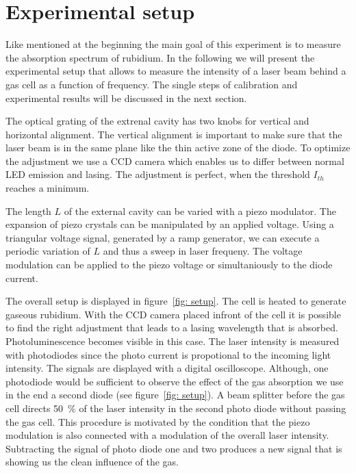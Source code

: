 \section{Experimental setup}
Like mentioned at the beginning the main goal of this experiment is to measure the absorption spectrum of rubidium.
In the following we will present the experimental setup that allows to measure the intensity of a laser beam
behind a gas cell as a function of frequency. The single steps of calibration and experimental results will be discussed
in the next section. 

The optical grating of the extrenal cavity has two knobs for vertical and horizontal alignment. The vertical alignment 
is important to make sure that the laser beam is in the same plane like the thin active zone of the diode. To optimize the adjustment 
we use a CCD camera which enables us to differ between normal LED emission and lasing. The adjustment is perfect, when the 
threshold $I_{th}$ reaches a minimum. 

The length $L$ of the external cavity can be varied with a piezo modulator. The expansion of piezo crystals can be 
manipulated by an
applied voltage. Using a triangular voltage signal, generated by a ramp generator, we can execute a periodic variation of $L$ 
and thus a sweep in laser frequeny. 
The voltage modulation can be applied to the piezo voltage or simultaniously to the diode current.

The overall setup is displayed in figure~\ref{fig: setup}. The cell is heated to generate gaseous rubidium. With the CCD camera placed infront of the cell it is possible to find the 
right adjustment that leads to a lasing wavelength that is absorbed. Photoluminescence becomes visible in this case.  
The laser intensity is measured with photodiodes since the photo current
is propotional to the incoming light intensity. The signals are displayed with a digital oscilloscope. 
Although, one photodiode would be sufficient to observe the effect of the gas absorption we use in the end 
a second diode (see figure~\ref{fig: setup}). A beam splitter before the gas cell directs \SI{50}{\percent}
of the laser intensity in the second photo diode without passing the gas cell. This procedure is motivated by the 
condition that the piezo modulation is also connected with a modulation of the overall laser intensity. Subtracting 
the signal of photo diode one and two produces a new signal that is showing us the clean influence of the gas.

